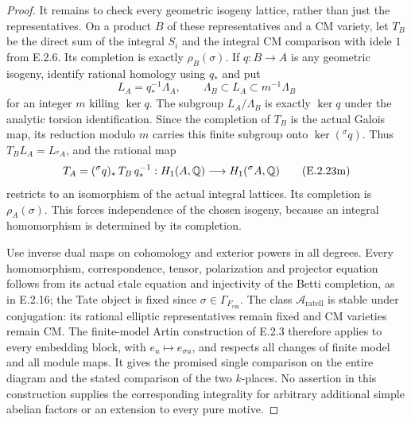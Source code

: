 \begin{proof}
It remains to check every geometric isogeny lattice, rather
than just the representatives. On a product \(B\) of these
representatives and a CM variety, let \(T_B\) be the direct
sum of the integral \(S_i\) and the integral CM comparison
with idele \(1\) from E.2.6. Its completion is exactly
\(\rho_B(\sigma)\). If \(q:B\to A\) is any geometric
isogeny, identify rational homology using \(q_*\) and put
\[
 L_A=q_*^{-1}\Lambda_A,
 \qquad \Lambda_B\subset L_A\subset m^{-1}\Lambda_B
 \tag{E.2.23l}
\]
for an integer \(m\) killing \(\ker q\).
The subgroup \(L_A/\Lambda_B\) is exactly \(\ker q\)
under the analytic torsion identification. Since the
completion of \(T_B\) is the actual Galois map, its
reduction modulo \(m\) carries this finite subgroup onto
\(\ker({}^{\sigma}q)\). Thus
\(T_B L_A=L_{{}^{\sigma}A}\), and the rational map
\[
 T_A=({}^{\sigma}q)_*\,T_B\,q_*^{-1}
       :H_1(A,\mathbb Q)\longrightarrow H_1({}^{\sigma}A,\mathbb Q)
 \tag{E.2.23m}
\]
restricts to an isomorphism of the actual integral lattices.
Its completion is \(\rho_A(\sigma)\). This forces
independence of the chosen isogeny, because an integral
homomorphism is determined by its completion.

Use inverse dual maps on cohomology and exterior powers in
all degrees. Every homomorphism, correspondence, tensor,
polarization and projector equation follows from its actual
\(\acute{e}\)tale equation and injectivity of the Betti
completion, as in E.2.16; the Tate object is fixed since
\(\sigma\in\Gamma_{F_{\mathrm{cm}}}\).
The class \(\mathcal A_{\mathrm{ratell}}\) is stable
under conjugation: its rational elliptic representatives
remain fixed and CM varieties remain CM. The finite-model
Artin construction of E.2.3 therefore applies to every
embedding block, with \(e_u\mapsto e_{\sigma u}\), and
respects all changes of finite model and all module maps.
It gives the promised single comparison on the entire
diagram and the stated comparison of the two \(k\)-places.
No assertion in this construction supplies the corresponding
integrality for arbitrary additional simple abelian factors
or an extension to every pure motive.
\end{proof}


